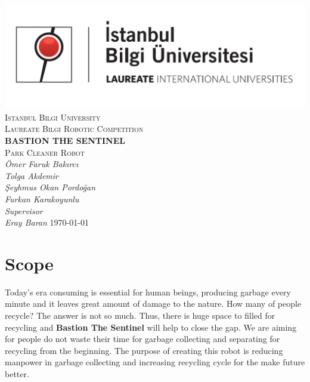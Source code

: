 \documentclass[12pt,a4paper]{article}
\begin{document}
\begin{titlepage}
 \centering
 \includegraphics[scale=0.3]{bilgi_logo}\\
 {\scshape\LARGE Istanbul Bilgi University\\}
 \vspace{1cm}
 {\scshape\Large Laureate Bilgi Robotic Competition\\}
 \vspace{2cm}
 {\huge\bfseries BASTION THE SENTINEL\\}
 {\scshape\Large Park Cleaner Robot\\}
 \vspace{2cm}
 {\Large\itshape Ömer Faruk Bakırcı\\}
 {\Large\itshape Tolga Akdemir\\}
 {\Large\itshape Şeyhmus Okan Pordoğan\\}
 {\Large\itshape Furkan Karakoyunlu\\}
 \vspace{4cm}
 {\Large\itshape Supervisor\\Eray Baran}
 \vfill
 \vfill
 {\large \today\\}
\end{titlepage}


\tableofcontents
\pagebreak

\section{Scope}
 \begin{flushleft}
  Today's era consuming is essential for human beings, producing garbage every minute and it leaves great amount of damage 
  to the nature. How many of people recycle? The answer is not so much. Thus, there is huge space to filled for recycling 
  and \textbf{Bastion The Sentinel} will help to close the gap. We are aiming for people do not waste their time for garbage 
  collecting and separating for recycling from the beginning. The purpose of creating this robot is reducing manpower in 
  garbage collecting and increasing recycling cycle for the make future better.
 \end{flushleft}
  
\end{document}
